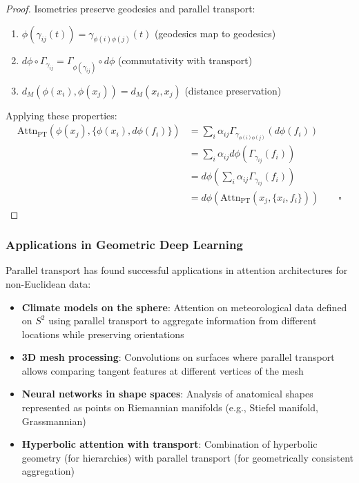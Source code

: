 \begin{proof}
Isometries preserve geodesics and parallel transport:
\begin{enumerate}
    \item $\phi(\gamma_{ij}(t)) = \gamma_{\phi(i)\phi(j)}(t)$ (geodesics map to geodesics)
    \item $d\phi \circ \Gamma_{\gamma_{ij}} = \Gamma_{\phi(\gamma_{ij})} \circ d\phi$ (commutativity with transport)
    \item $d_M(\phi(x_i), \phi(x_j)) = d_M(x_i, x_j)$ (distance preservation)
\end{enumerate}

Applying these properties:
\begin{align}
\text{Attn}_{\text{PT}}(\phi(x_j), \{\phi(x_i), d\phi(f_i)\}) &= \sum_i \alpha_{ij} \Gamma_{\gamma_{\phi(i)\phi(j)}}(d\phi(f_i)) \\
&= \sum_i \alpha_{ij} d\phi(\Gamma_{\gamma_{ij}}(f_i)) \\
&= d\phi\left(\sum_i \alpha_{ij} \Gamma_{\gamma_{ij}}(f_i)\right) \\
&= d\phi(\text{Attn}_{\text{PT}}(x_j, \{x_i, f_i\})) \qquad \square
\end{align}
\end{proof}

\subsubsection{Applications in Geometric Deep Learning}

Parallel transport has found successful applications in attention architectures for non-Euclidean data:

\begin{itemize}
    \item \textbf{Climate models on the sphere}: Attention on meteorological data defined on $S^2$ using parallel transport to aggregate information from different locations while preserving orientations

    \item \textbf{3D mesh processing}: Convolutions on surfaces where parallel transport allows comparing tangent features at different vertices of the mesh

    \item \textbf{Neural networks in shape spaces}: Analysis of anatomical shapes represented as points on Riemannian manifolds (e.g., Stiefel manifold, Grassmannian)

    \item \textbf{Hyperbolic attention with transport}: Combination of hyperbolic geometry (for hierarchies) with parallel transport (for geometrically consistent aggregation)
\end{itemize}


